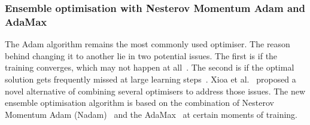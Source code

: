 %
\subsubsection{Ensemble optimisation with Nesterov Momentum Adam and AdaMax}
The Adam algorithm remains the most commonly used optimiser.
The reason behind changing it to another lie in two potential issues.
The first is if the training converges, which may not happen at all~\cite{reddi_convergence_2019}.
The second is if the optimal solution gets frequently missed at large learning steps~\cite{wilson_marginal_2017}.
Xioa et al.~\cite{xiao_accurate_2019} proposed a novel alternative of combining several optimisers to address those issues.
The new ensemble optimisation algorithm is based on the combination of Nesterov Momentum Adam (Nadam)~\cite{dozat_nadam_2016} and the AdaMax~\cite{kingma_adam_2017} at certain moments of training.

